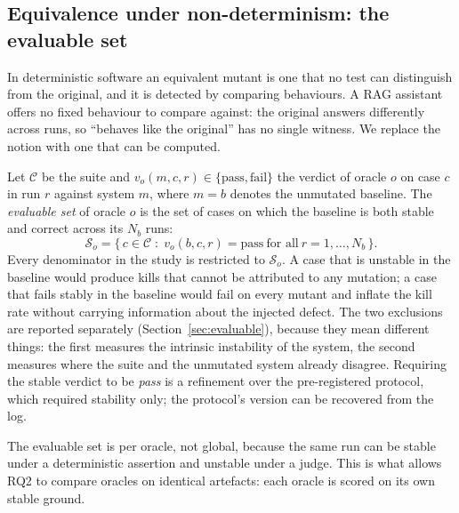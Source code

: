 \documentclass[a4paper,fleqn]{cas-dc}
\newcommand{\Sset}{\mathcal{S}}
\newcommand{\Cset}{\mathcal{C}}
\newcommand{\pass}{\mathrm{pass}}
\newcommand{\fail}{\mathrm{fail}}
\begin{document}
\subsection{Equivalence under non-determinism: the evaluable set}
\label{sec:equivalence}

In deterministic software an equivalent mutant is one that no test can
distinguish from the original, and it is detected by comparing behaviours. A
RAG assistant offers no fixed behaviour to compare against: the original
answers differently across runs, so ``behaves like the original'' has no single
witness. We replace the notion with one that can be computed.

Let $\Cset$ be the suite and $v_o(m, c, r) \in \{\pass, \fail\}$ the verdict of
oracle $o$ on case $c$ in run $r$ against system $m$, where $m = b$ denotes the
unmutated baseline. The \emph{evaluable set} of oracle $o$ is the set of cases
on which the baseline is both stable and correct across its $N_b$ runs:
\begin{equation}
\label{eq:evaluable}
\Sset_o = \bigl\{\, c \in \Cset \;:\; v_o(b, c, r) = \pass \ \text{for all}\ r = 1, \dots, N_b \,\bigr\}.
\end{equation}
Every denominator in the study is restricted to $\Sset_o$. A case that is
unstable in the baseline would produce kills that cannot be attributed to any
mutation; a case that fails stably in the baseline would fail on every mutant
and inflate the kill rate without carrying information about the injected
defect. The two exclusions are reported separately (Section~\ref{sec:evaluable}),
because they mean different things: the first measures the intrinsic
instability of the system, the second measures where the suite and the
unmutated system already disagree. Requiring the stable verdict to be
\emph{pass} is a refinement over the pre-registered protocol, which required
stability only; the protocol's version can be recovered from the log.

The evaluable set is per oracle, not global, because the same run can be
stable under a deterministic assertion and unstable under a judge. This is what
allows RQ2 to compare oracles on identical artefacts: each oracle is scored on
its own stable ground.
\end{document}
